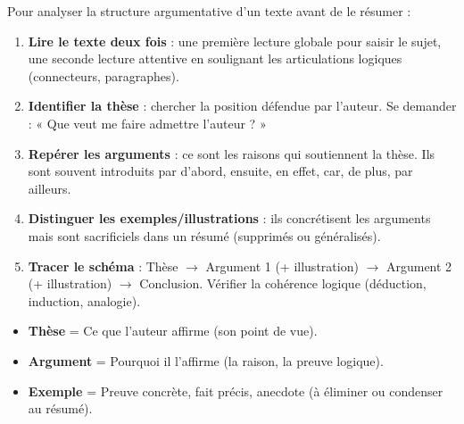 \documentclass[11pt]{article}
\newcommand{\cle}[1]{{\popxbold\color{popdark}#1}}
\begin{document}
\begin{methode}
Pour analyser la structure argumentative d'un texte avant de le résumer :
\begin{enumerate}
\item \textbf{Lire le texte deux fois} : une première lecture globale pour saisir le sujet, une seconde lecture attentive en soulignant les articulations logiques (connecteurs, paragraphes).
\item \textbf{Identifier la thèse} : chercher la position défendue par l'auteur. Se demander : « Que veut me faire admettre l'auteur ? »
\item \textbf{Repérer les arguments} : ce sont les raisons qui soutiennent la thèse. Ils sont souvent introduits par \cle{d'abord}, \cle{ensuite}, \cle{en effet}, \cle{car}, \cle{de plus}, \cle{par ailleurs}.
\item \textbf{Distinguer les exemples/illustrations} : ils concrétisent les arguments mais sont \cle{sacrificiels} dans un résumé (supprimés ou généralisés).
\item \textbf{Tracer le schéma} : Thèse $\rightarrow$ Argument 1 (+ illustration) $\rightarrow$ Argument 2 (+ illustration) $\rightarrow$ Conclusion. Vérifier la cohérence logique (déduction, induction, analogie).
\end{enumerate}
\end{methode}

\begin{aretenir}
\begin{itemize}
\item \textbf{Thèse} = Ce que l'auteur affirme (son point de vue).
\item \textbf{Argument} = Pourquoi il l'affirme (la raison, la preuve logique).
\item \textbf{Exemple} = Preuve concrète, fait précis, anecdote (à éliminer ou condenser au résumé).
\end{itemize}
\end{aretenir}
\end{document}
